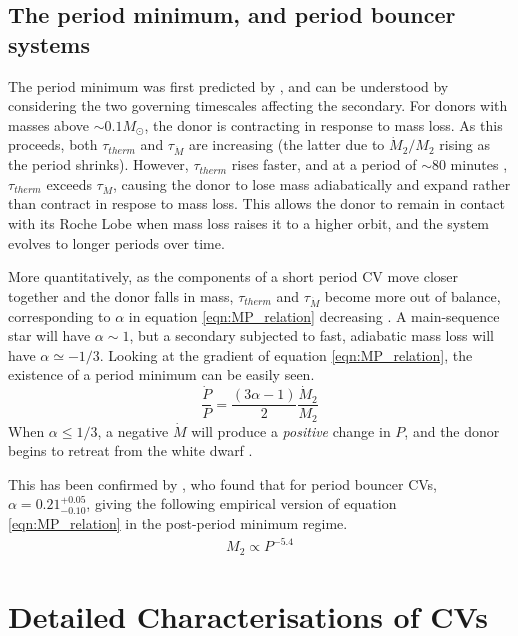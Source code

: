 \subsection{The period minimum, and period bouncer systems}
\label{sect:introduction:period minimum and bouncers}

The period minimum was first predicted by \citet{rappaport1982}, and can be understood by considering the two governing timescales affecting the secondary. 
For donors with masses above $\sim0.1 M_{\odot}$, the donor is contracting in response to mass loss. 
As this proceeds, both $\tau_{therm}$ and $\tau_{\dot M}$ are increasing (the latter due to $\dot M_2 / M_2$ rising as the period shrinks). However, $\tau_{therm}$ rises faster, and at a period of $\sim80$ minutes \citep{ritter1998, McAllister2019}, $\tau_{therm}$ exceeds $\tau_{\dot M}$, causing the donor to lose mass adiabatically and expand rather than contract in respose to mass loss.
This allows the donor to remain in contact with its Roche Lobe when mass loss raises it to a higher orbit, and the system evolves to longer periods over time.

More quantitatively, as the components of a short period CV move closer together and the donor falls in mass, $\tau_{therm}$ and $\tau_{\dot M}$ become more out of balance, corresponding to $\alpha$ in equation \ref{eqn:MP_relation} decreasing \citep{Knigge2011b}. A main-sequence star will have $\alpha \sim 1$, but a secondary subjected to fast, adiabatic mass loss will have $\alpha \simeq -1/3$. Looking at the gradient of equation \ref{eqn:MP_relation}, the existence of a period minimum can be easily seen.
\begin{equation}
    \frac{\dot P}{P} = \frac{(3\alpha - 1)}{2} \frac{\dot M_2}{M_2}
\end{equation}
When $\alpha \le 1/3$, a negative $\dot M$ will produce a \textit{positive} change in $P$, and the donor begins to retreat from the white dwarf \citep{rezzolla2001}. 

This has been confirmed by \citet{knigge11}, who found that for period bouncer CVs, $\alpha = 0.21^{+0.05}_{-0.10}$, giving the following empirical version of equation \ref{eqn:MP_relation} in the post-period minimum regime.
\begin{align}
    M_2 \propto P^{-5.4}
\end{align}


\section{Detailed Characterisations of CVs}


